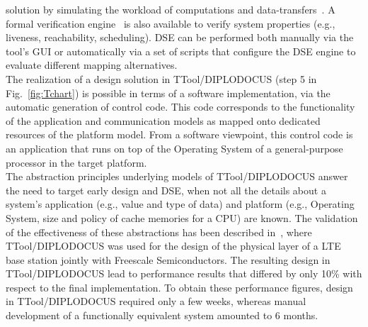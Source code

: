 \documentclass{llncs}
\begin{document}
solution by simulating the workload of computations and data-transfers~\cite{Knorreck11}. A formal verification
engine~\cite{Knorreck11} is also available to verify system properties (e.g., liveness, reachability, scheduling). DSE
can be performed both manually via the tool's GUI or automatically via a set of scripts that configure the DSE engine to
evaluate different mapping alternatives.\\
%
The realization of a design solution in TTool/DIPLODOCUS (step 5 in Fig.~\ref{fig:Tchart}) is possible in terms of a
software implementation, via the automatic generation of control code. This code corresponds to the functionality of
the application and communication models as mapped onto dedicated resources of the platform model. From a software
viewpoint, this control code is an application that runs on top of the Operating System of a general-purpose processor
in the target platform.\\
%
The abstraction principles underlying models of TTool/\-DI\-PLO\-DO\-CUS answer the need to target early design and DSE,
when not all the details about a system's application (e.g., value and type of data) and platform (e.g., Operating
System, size and policy of cache memories for a CPU) are known. The validation of the effectiveness of these
abstractions has been described in~\cite{Jaber2011}, where TTool/DIPLODOCUS was used for the design of the physical
layer of a LTE base station jointly with Freescale Semiconductors. The resulting design in TTool/\-DI\-PLO\-DO\-CUS lead
to performance results that differed by only 10\% with respect to the final implementation. To obtain these performance
figures, design in TTool/\-DI\-PLO\-DO\-CUS required only a few weeks, whereas manual development of a functionally
equivalent system amounted to 6 months.
%
%
%
\end{document}
